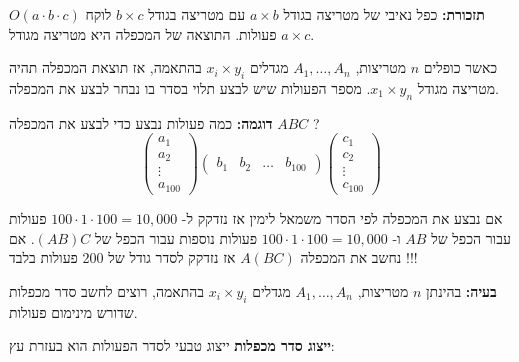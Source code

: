 \textbf{תזכורת:}
כפל נאיבי של מטריצה בגודל 
$a \times b$
עם מטריצה בגודל 
$b \times c$
לוקח 
$O(a \cdot b \cdot c)$
פעולות.
התוצאה של המכפלה היא מטריצה מגודל 
$a \times c$.

כאשר כופלים $n$ מטריצות, 
$A_1,\ldots,A_n$
מגדלים 
$x_i \times y_i$
בהתאמה, אז תוצאת המכפלה תהיה מטריצה מגודל
$x_1 \times y_n$.
מספר הפעולות שיש לבצע תלוי בסדר בו נבחר לבצע את המכפלה.

\textbf{דוגמה:}
כמה פעולות נבצע כדי לבצע את המכפלה
$ABC$
?
$$
\begin{pmatrix}
a_{1}
\\
a_{2}
\\
\vdots
\\
a_{100}
\end{pmatrix}
%
\begin{pmatrix}
b_{1}	&	b_{2} & \dots &  b_{100}
\end{pmatrix}
%
\begin{pmatrix}
c_{1}
\\
c_{2}
\\
\vdots
\\
c_{100}
\end{pmatrix}
$$

אם נבצע את המכפלה לפי הסדר משמאל לימין אז נזדקק ל-%
$100 \cdot 1 \cdot 100 = 10,000$
פעולות עבור הכפל של 
$AB$
ו-%
$100 \cdot 1 \cdot 100 = 10,000$
פעולות נוספות עבור הכפל של
$(AB)C$.
אם נחשב את המכפלה
$A(BC)$
אז נזדקק לסדר גודל של 200 פעולות בלבד !!!

\textbf{בעיה:}
בהינתן $n$ מטריצות, 
$A_1,\ldots,A_n$
מגדלים 
$x_i \times y_i$
בהתאמה, רוצים לחשב סדר מכפלות שדורש מינימום פעולות.

\textbf{ייצוג סדר מכפלות}
ייצוג טבעי לסדר הפעולות הוא בעזרת עץ:
\begin{center}
\end{center}



